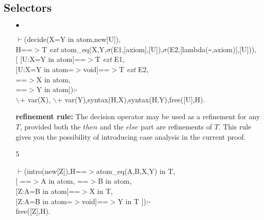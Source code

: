 \documentclass[11pt]{report}
\begin{document}
 \subsection{Selectors}
  
 \begin{enumerate}
 \item[$\bullet$] 
\begin{sf}\begin{tabbing}
$\vdash$(decide(X=Y in atom,new[U]),\\[-0.15ex]
\hspace{2em}H==$>$T \mbox{\it ext} atom\_\hspace{0.1em}eq(X,Y,$\sigma$(E1,[axiom],[U]),$\sigma$(E2,[lambda({\verb`~`},axiom)],[U])),\\[-0.15ex]
\hspace{2em}[ [U:X=Y in atom]==$>$T \mbox{\it ext} E1, \\[-0.15ex]
\hspace{2em}[U:X=Y in atom=$>$void]==$>$T \mbox{\it ext} E2,\\[-0.15ex]
\hspace{3em}==$>$X in atom,\\[-0.15ex]
\hspace{3em}==$>$Y in atom]):-\\[-0.15ex]
\hspace{2em}$\backslash$+ var(X), $\backslash$+ var(Y),syntax(H,X),syntax(H,Y),free([U],H).
\end{tabbing}\end{sf}

 {\bf refinement rule:}
 The decision operator may be used as a refinement for any
 $T$, provided both the $then$ and the $else$ part are refinements
 of $T$. This rule gives you the possibility of introducing 
 case analysis in the current proof.
  
 \item[5] 
\begin{sf}\begin{tabbing}
$\vdash$(intro(new[Z]),H==$>$atom\_\hspace{0.1em}eq(A,B,X,Y) in T,\\[-0.15ex]
\hspace{2em}[ ==$>$A in atom, ==$>$B in atom,\\[-0.15ex]
\hspace{2em}[Z:A=B in atom]==$>$X in T, \\[-0.15ex]
\hspace{2em}[Z:A=B in atom=$>$void]==$>$Y in T ]):-\\[-0.15ex]
\hspace{2em}free([Z],H).
\end{tabbing}\end{sf}


\end{enumerate}
\end{document}
